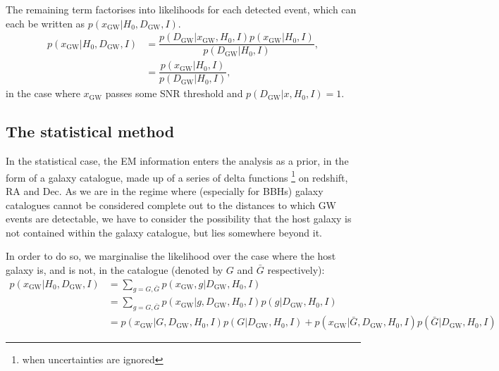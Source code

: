 \documentclass[a4paper,10pt]{article}
\begin{document}
The remaining term factorises into likelihoods for each detected event,
which can each be written as $p(x_{\text{GW}}|H_0,D_{\text{GW}},I)$.
\begin{equation}
\label{Eq.xD}
\begin{aligned}
p(x_{\text{GW}}|H_0,D_{\text{GW}},I) &= \dfrac{p(D_{\text{GW}}|x_{\text{GW}},H_0,I)p(x_{\text{GW}}|H_0,I)}{p(D_{\text{GW}}|H_0,I)},
\\ &= \dfrac{p(x_{\text{GW}}|H_0,I)}{p(D_{\text{GW}}|H_0,I)},
\end{aligned} 
\end{equation}
in the case where $x_{\text{GW}}$ passes some SNR threshold and $p(D_{\text{GW}}|x,H_0,I)=1$.

\subsection{The statistical method}
In the statistical case, the EM information enters the analysis as a prior, in the form of a galaxy catalogue, made up of a series of delta functions \footnote{when uncertainties are ignored} on redshift, RA and Dec.  As we are in the regime where (especially for BBHs) galaxy catalogues cannot be considered complete out to the distances to which GW events are detectable, we have to consider the possibility that the host galaxy is not contained within the galaxy catalogue, but lies somewhere beyond it.

In order to do so, we marginalise the likelihood over the case where the host galaxy is, and is not, in the catalogue (denoted by $G$ and $\bar{G}$ respectively):
\begin{equation} \label{Eq:sum G}
\begin{aligned}
p(x_{\text{GW}}|H_0,D_{\text{GW}},I) &= \sum_{g=G,\bar{G}} p(x_{\text{GW}},g|D_{\text{GW}},H_0,I)
\\ &= \sum_{g=G,\bar{G}} p(x_{\text{GW}}|g,D_{\text{GW}},H_0,I) p(g|D_{\text{GW}},H_0,I)
\\ &= p(x_{\text{GW}}|G,D_{\text{GW}},H_0,I) p(G|D_{\text{GW}},H_0,I) + p(x_{\text{GW}}|\bar{G},D_{\text{GW}},H_0,I) p(\bar{G}|D_{\text{GW}},H_0,I)
\end{aligned} 
\end{equation}
\end{document}
